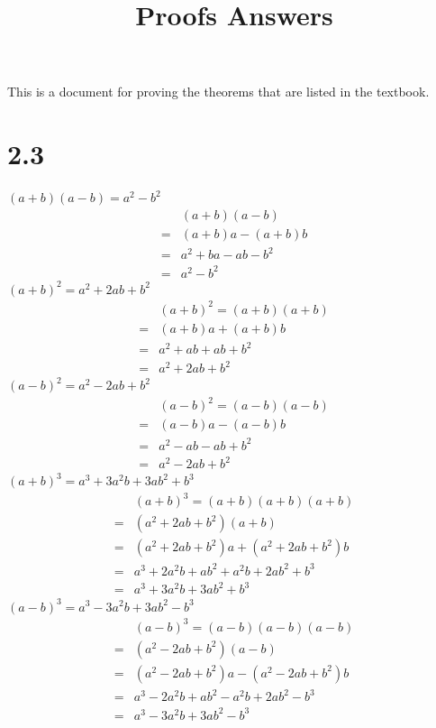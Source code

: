 \documentclass{article}
\title{Proofs Answers}
\theoremstyle{definition}
\begin{document}
\maketitle

This is a document for proving the theorems that are listed in the textbook.

\section*{2.3}
$(a+b)(a-b)=a^2-b^2$
\[
\begin{array}{rl}
	& (a+b)(a-b) \\
=	& (a+b)a-(a+b)b \\
=	& a^2+ba-ab-b^2 \\
=	& a^2-b^2
\end{array}
\]
\newline
$(a+b)^2=a^2+2ab+b^2$
\[
\begin{array}{rl}
	& (a+b)^2=(a+b)(a+b) \\
=	& (a+b)a+(a+b)b \\
=	& a^2+ab+ab+b^2 \\
=	& a^2+2ab+b^2
\end{array}
\]
\newline
$(a-b)^2=a^2-2ab+b^2$
\[
\begin{array}{rl}
	& (a-b)^2=(a-b)(a-b) \\
=	& (a-b)a-(a-b)b \\
=	& a^2-ab-ab+b^2 \\
=	& a^2-2ab+b^2
\end{array}
\]
\newline
$(a+b)^3=a^3+3a^2b+3ab^2+b^3$
\[
\begin{array}{rl}
	& (a+b)^3=(a+b)(a+b)(a+b) \\
=	& (a^2+2ab+b^2)(a+b) \\
=	& (a^2+2ab+b^2)a+(a^2+2ab+b^2)b \\
=	& a^3+2a^2b+ab^2+a^2b+2ab^2+b^3 \\
=	& a^3+3a^2b+3ab^2+b^3
\end{array}
\]
\newline
$(a-b)^3=a^3-3a^2b+3ab^2-b^3$
\[
\begin{array}{rl}
	& (a-b)^3=(a-b)(a-b)(a-b) \\
=	& (a^2-2ab+b^2)(a-b) \\
=	& (a^2-2ab+b^2)a-(a^2-2ab+b^2)b \\
=	& a^3-2a^2b+ab^2-a^2b+2ab^2-b^3 \\
=	& a^3-3a^2b+3ab^2-b^3
\end{array}
\]
\end{document}
